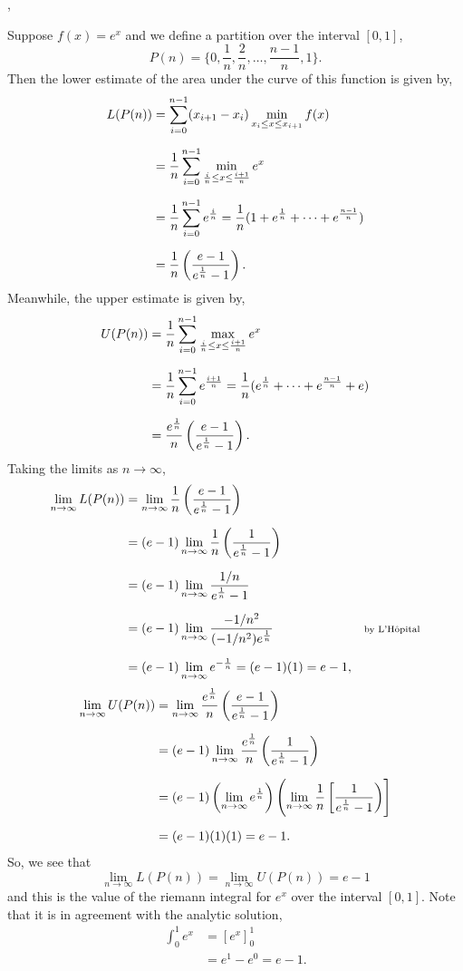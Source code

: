 \documentclass[../MathsNotesBase.tex]{subfiles}
\begin{document}
{		
		\sep
		\begin{exe}
			\item{Suppose ${ f(x) = e^x }$ and we define a partition over the interval $[0,1]$,
				\[ P(n) = \{0, \frac{1}{n}, \frac{2}{n}, \dots, \frac{n-1}{n}, 1\}. \]
				Then the lower estimate of the area under the curve of this function is given by,
				\begin{align*}
					L(P(n)) &= \sum_{i=0}^{n-1} (x_{i+1} - x_i) \min_{ x_i \leq x \leq x_{i+1} }{ f(x) } \nn
					&= \frac{1}{n} \sum_{i=0}^{n-1} \min_{ \frac{i}{n} \leq x \leq \frac{i+1}{n} }{ e^x } \nn
					&= \frac{1}{n} \sum_{i=0}^{n-1} e^{\frac{i}{n}} = \frac{1}{n} (1 + e^{\frac{1}{n}} + \cdots + e^{\frac{n-1}{n}}) \nn
					&= \frac{1}{n} \left( \frac{e - 1}{e^{\frac{1}{n}} - 1} \right).\\
				\end{align*}
				Meanwhile, the upper estimate is given by,
				\begin{align*}
					U(P(n)) &= \frac{1}{n} \sum_{i=0}^{n-1} \max_{ \frac{i}{n} \leq x \leq \frac{i+1}{n} }{ e^x } \nn
					&= \frac{1}{n} \sum_{i=0}^{n-1} e^{\frac{i+1}{n}} = \frac{1}{n} (e^{\frac{1}{n}} + \cdots + e^{\frac{n-1}{n}} + e) \nn
					&= \frac{e^{\frac{1}{n}}}{n} \left( \frac{e - 1}{e^{\frac{1}{n}} - 1} \right).\\
				\end{align*}
				Taking the limits as ${ n \to \infty }$,
				\begin{align*}
					\lim_{n \to \infty} L(P(n)) &= \lim_{n \to \infty} \frac{1}{n} \left( \frac{e - 1}{e^{\frac{1}{n}} - 1} \right) \nn
					&= (e - 1) \lim_{n \to \infty} \frac{1}{n} \left( \frac{1}{e^{\frac{1}{n}} - 1} \right)  &\sidecomment{} \nn
					&= (e - 1) \lim_{n \to \infty} \frac{1/n}{e^{\frac{1}{n}} - 1}  &\sidecomment{} \nn
					&= (e - 1) \lim_{n \to \infty} \frac{-1/n^2}{(-1/n^2)e^{\frac{1}{n}}}  &\sidecomment{by L'H\^{o}pital} \nn
					&= (e - 1) \lim_{n \to \infty} e^{-\frac{1}{n}} = (e - 1)(1) = e - 1,
				\end{align*}
				\begin{align*}
					\lim_{n \to \infty} U(P(n)) &= \lim_{n \to \infty} \frac{e^{\frac{1}{n}}}{n} \left( \frac{e - 1}{e^{\frac{1}{n}} - 1} \right) \nn
					&= (e - 1) \lim_{n \to \infty} \frac{e^{\frac{1}{n}}}{n} \left( \frac{1}{e^{\frac{1}{n}} - 1} \right) \nn
					&= (e - 1) \left( \lim_{n \to \infty} e^{\frac{1}{n}} \right) \left( \lim_{n \to \infty} \frac{1}{n} \left[ \frac{1}{e^{\frac{1}{n}} - 1} \right) \right] \nn
					&= (e - 1) (1) (1) = e - 1. \\
				\end{align*}
				So, we see that 
				\[ \lim_{n \to \infty} L(P(n)) = \lim_{n \to \infty} U(P(n)) = e - 1 \]
				and this is the value of the riemann integral for $e^x$ over the interval $[0,1]$. Note that it is in agreement with the analytic solution,
				\begin{align*}
					\int_0^1 e^x &= [e^x]_0^1 \\
					&= e^1 - e^0 = e - 1.
				\end{align*}
			}
		\end{exe}
		
}
\end{document}
